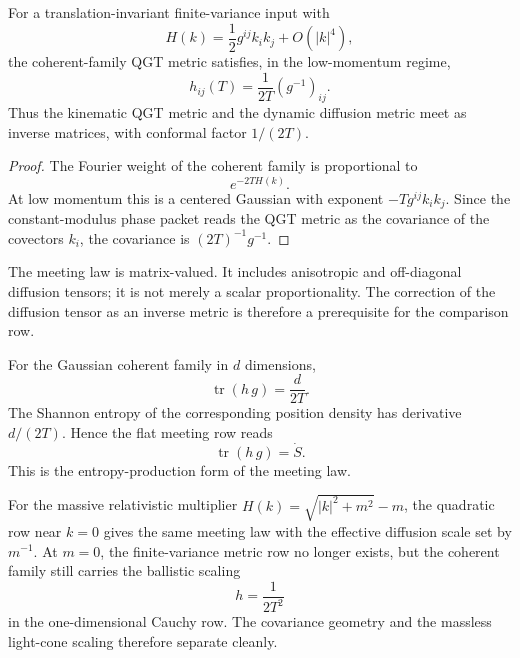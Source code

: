 \begin{theorem}
\label{thm:innovation-input-thermo-meeting-law}
For a translation-invariant finite-variance input with
$$
H(k)=\frac12g^{ij}k_ik_j+O(|k|^4),
$$
the coherent-family QGT metric satisfies, in the low-momentum regime,
$$
h_{ij}(T)=\frac{1}{2T}(g^{-1})_{ij}.
$$
Thus the kinematic QGT metric and the dynamic diffusion metric meet as
inverse matrices, with conformal factor $1/(2T)$.
\end{theorem}

\begin{proof}
The Fourier weight of the coherent family is proportional to
$$
e^{-2TH(k)}.
$$
At low momentum this is a centered Gaussian with exponent
$-Tg^{ij}k_ik_j$. Since the constant-modulus phase packet reads the QGT
metric as the covariance of the covectors $k_i$, the covariance is
$(2T)^{-1}g^{-1}$.
\end{proof}

\begin{principle}
\label{prin:innovation-input-thermo-anisotropic-closure}
The meeting law is matrix-valued. It includes anisotropic and off-diagonal
diffusion tensors; it is not merely a scalar proportionality. The correction
of the diffusion tensor as an inverse metric is therefore a prerequisite for
the comparison row.
\end{principle}

\begin{principle}
\label{prin:innovation-input-thermo-flat-entropy-production}
For the Gaussian coherent family in $d$ dimensions,
$$
\operatorname{tr}(h\,g)=\frac{d}{2T}.
$$
The Shannon entropy of the corresponding position density has derivative
$d/(2T)$. Hence the flat meeting row reads
$$
\operatorname{tr}(h\,g)=\dot S.
$$
This is the entropy-production form of the meeting law.
\end{principle}

\begin{principle}
\label{prin:innovation-input-thermo-finite-mass-massless-boundary}
For the massive relativistic multiplier
$H(k)=\sqrt{|k|^2+m^2}-m$, the quadratic row near $k=0$ gives the same
meeting law with the effective diffusion scale set by $m^{-1}$. At
$m=0$, the finite-variance metric row no longer exists, but the coherent
family still carries the ballistic scaling
$$
h=\frac{1}{2T^2}
$$
in the one-dimensional Cauchy row. The covariance geometry and the
massless light-cone scaling therefore separate cleanly.
\end{principle}

